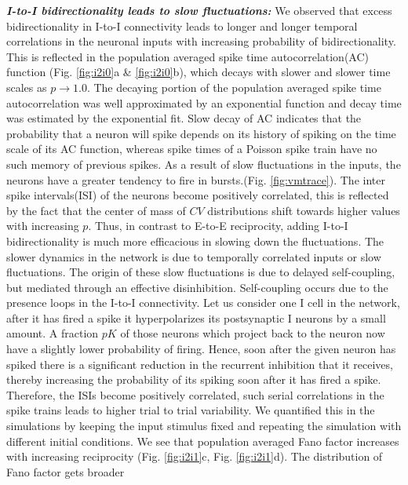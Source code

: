 
\emph{\textbf{I-to-I bidirectionality leads to slow fluctuations:}} We observed that excess bidirectionality in I-to-I connectivity leads to longer and longer temporal correlations in the neuronal inputs with increasing probability of bidirectionality. This is reflected in the population averaged spike time autocorrelation(AC) function (Fig. \ref{fig:i2i0}a \& \ref{fig:i2i0}b), which decays with slower and slower time scales as $p \rightarrow 1.0$. The decaying portion of the population averaged spike time autocorrelation was well approximated by an exponential function and decay time was estimated by the exponential fit. Slow decay of AC indicates that the probability that a neuron will spike depends on its history of spiking on the time scale of its AC function, whereas spike times of a Poisson spike train have no such memory of previous spikes. As a result of slow fluctuations in the inputs, the neurons have a greater tendency to fire in bursts.(Fig. \ref{fig:vmtrace}). The inter spike intervals(ISI) of the neurons become positively correlated, this is reflected by the fact that the center of mass of $CV$ distributions shift towards higher values with increasing $p$. Thus, in contrast to E-to-E reciprocity, adding I-to-I bidirectionality is much more efficacious in slowing down the fluctuations. The slower dynamics in the network is due to temporally correlated inputs or slow fluctuations. The origin of these slow fluctuations is due to delayed self-coupling, but mediated through an effective disinhibition. Self-coupling occurs due to the presence loops in the I-to-I connectivity. Let us consider one I cell in the network, after it has fired a spike it hyperpolarizes its postsynaptic I neurons by a small amount. A fraction $pK$ of those neurons which project back to the neuron now have a slightly lower probability of firing. Hence, soon after the given neuron has spiked there is a significant reduction in the recurrent inhibition that it receives, thereby increasing the probability of its spiking soon after it has fired a spike. Therefore, the ISIs become positively correlated, such serial correlations in the spike trains leads to higher trial to trial variability. We quantified this in the simulations by keeping the input stimulus fixed and repeating the simulation with different initial conditions. We see that population averaged Fano factor increases with increasing reciprocity (Fig. \ref{fig:i2i1}c, Fig. \ref{fig:i2i1}d). The distribution of Fano factor  gets broader 